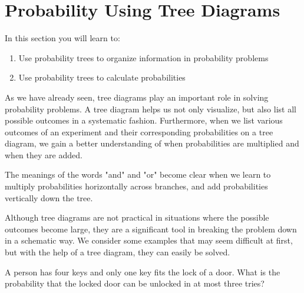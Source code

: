 \section{Probability Using Tree Diagrams}

In this section you will learn to:
\begin{enumerate}
    \item Use probability trees to organize information in probability problems
    \item Use probability trees to calculate probabilities
\end{enumerate}

As we have already seen, tree diagrams play an important role in solving probability problems. A tree diagram helps us not only visualize, but also list all possible outcomes in a systematic fashion. Furthermore, when we list various outcomes of an experiment and their corresponding probabilities on a tree diagram, we gain a better understanding of when probabilities are multiplied and when they are added.

The meanings of the words "and" and "or" become clear when we learn to multiply probabilities horizontally across branches, and add probabilities vertically down the tree.

Although tree diagrams are not practical in situations where the possible outcomes become large, they are a significant tool in breaking the problem down in a schematic way. We consider some examples that may seem difficult at first, but with the help of a tree diagram, they can easily be solved.

\begin{example}
    A person has four keys and only one key fits the lock of a door. What is the probability that the locked door can be unlocked in at most three tries?
\end{example}

